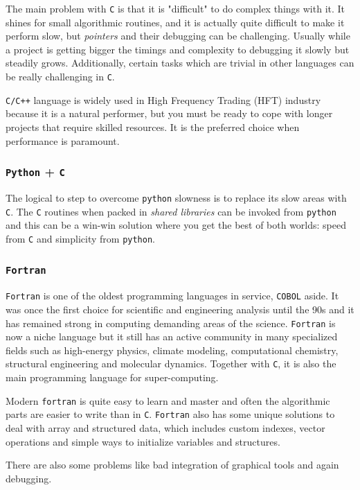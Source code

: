 The main problem with \texttt{C} is that it is "difficult" to do complex things with it. It shines for small algorithmic routines, and it is actually quite difficult to make it perform slow, but \emph{pointers} and their debugging can be challenging.
Usually while a project is getting bigger the timings and complexity to debugging it slowly but steadily grows.
Additionally, certain tasks which are trivial in other languages can be really challenging in \texttt{C}. 

\texttt{C/C++} language is widely used in High Frequency Trading (HFT) industry because it is a natural performer, but you must be ready to cope with longer projects that require skilled resources. It is the preferred choice when performance is paramount. 

\subsubsection{\texttt{Python} + \texttt{C}}
The logical to step to overcome \texttt{python} slowness is to replace its slow areas with \texttt{C}. 
The \texttt{C} routines when packed in \emph{shared libraries} can be invoked from \texttt{python} and this can be a win-win solution where you get the best of both worlds: speed from \texttt{C} and simplicity from \texttt{python}.

\subsubsection{\texttt{Fortran}}
\texttt{Fortran} is one of the oldest programming languages in service, \texttt{COBOL} aside. It was once the first choice for scientific and engineering analysis until the 90s and it has remained strong in computing demanding areas of the science.
\texttt{Fortran} is now a niche language but it still has an active community in many specialized fields such as high-energy physics, climate modeling, computational chemistry, structural engineering and molecular dynamics. Together with \texttt{C}, it is also the main programming language for super-computing. 

Modern \texttt{fortran} is quite easy to learn and master and often the algorithmic parts are easier to write than in \texttt{C}. \texttt{Fortran} also has some unique solutions to deal with array and structured data, which includes custom indexes, vector operations and simple ways to initialize variables and structures.

There are also some problems like bad integration of graphical tools and again debugging.  

